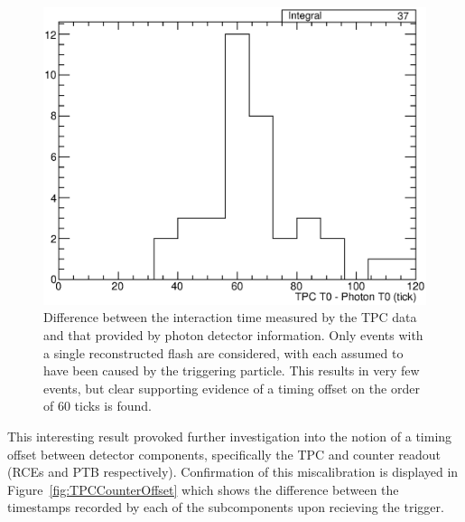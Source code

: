 \begin{figure}
  \centering
  \includegraphics[width=12cm]{T0OffsetTPCPhoton.eps}
  \caption[Difference between the interaction time measured by the TPC data and that provided by photon detector information.]{Difference between the interaction time measured by the TPC data and that provided by photon detector information.  Only events with a single reconstructed flash are considered, with each assumed to have been caused by the triggering particle.  This results in very few events, but clear supporting evidence of a timing offset on the order of 60 ticks is found.}
  \label{fig:TPCPhotonT0Difference}
\end{figure}

This interesting result provoked further investigation into the notion of a timing offset between detector components, specifically the TPC and counter readout (RCEs and PTB respectively).  Confirmation of this miscalibration is displayed in Figure~\ref{fig:TPCCounterOffset} which shows the difference between the timestamps recorded by each of the subcomponents upon recieving the trigger.

